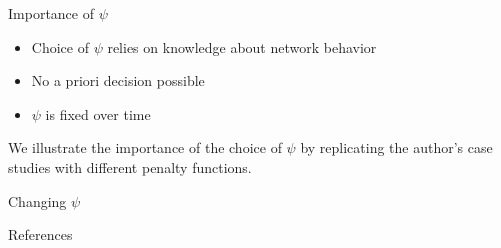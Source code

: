 \documentclass{beamer}
\begin{document}
\begin{frame}{Importance of $\psi$}
    \begin{itemize}
        \item Choice of $\psi$ relies on knowledge about network behavior
        \item No a priori decision possible
        \item $\psi$ is fixed over time
    \end{itemize}
    We illustrate the importance of the choice of $\psi$ by replicating the author's case studies with different
    penalty functions.
\end{frame}

\begin{frame}{Changing $\psi$}

\end{frame}

\begin{frame}{References}
    \nocite{*}
    
    
\end{frame}
\end{document}
